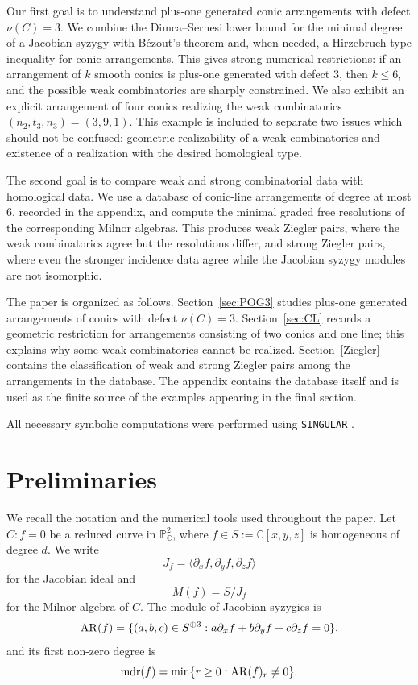 \documentclass[11pt]{article}
\theoremstyle{plain}
\theoremstyle{definition}
\begin{document}
Our first goal is to understand plus-one generated conic arrangements with defect $\nu(C)=3$. We combine the Dimca--Sernesi lower bound for the minimal degree of a Jacobian syzygy with B\'ezout's theorem and, when needed, a Hirzebruch-type inequality for conic arrangements. This gives strong numerical restrictions: if an arrangement of $k$ smooth conics is plus-one generated with defect $3$, then $k\leq 6$, and the possible weak combinatorics are sharply constrained. We also exhibit an explicit arrangement of four conics realizing the weak combinatorics $(n_2,t_3,n_3)=(3,9,1)$. This example is included to separate two issues which should not be confused: geometric realizability of a weak combinatorics and existence of a realization with the desired homological type.

The second goal is to compare weak and strong combinatorial data with homological data. We use a database of conic-line arrangements of degree at most $6$, recorded in the appendix, and compute the minimal graded free resolutions of the corresponding Milnor algebras. This produces weak Ziegler pairs, where the weak combinatorics agree but the resolutions differ, and strong Ziegler pairs, where even the stronger incidence data agree while the Jacobian syzygy modules are not isomorphic.

The paper is organized as follows. Section~\ref{sec:POG3} studies plus-one generated arrangements of conics with defect $\nu(C)=3$. Section~\ref{sec:CL} records a geometric restriction for arrangements consisting of two conics and one line; this explains why some weak combinatorics cannot be realized. Section~\ref{Ziegler} contains the classification of weak and strong Ziegler pairs among the arrangements in the database. The appendix contains the database itself and is used as the finite source of the examples appearing in the final section. 

All necessary symbolic computations were performed using \texttt{SINGULAR} \cite{Singular}.

\section{Preliminaries}
We recall the notation and the numerical tools used throughout the paper. Let $C:f=0$ be a reduced curve in $\mathbb{P}^{2}_{\mathbb{C}}$, where $f\in S:=\mathbb{C}[x,y,z]$ is homogeneous of degree $d$. We write
\[
J_f=\langle \partial_x f,\partial_y f,\partial_z f\rangle
\]
for the Jacobian ideal and
\[
M(f)=S/J_f
\]
for the Milnor algebra of $C$. The module of Jacobian syzygies is
\[
{\rm AR}(f)=\{(a,b,c)\in S^{\oplus 3}:a\partial_xf+b\partial_yf+c\partial_zf=0\},
\]
and its first non-zero degree is
\[
{\rm mdr}(f)=\min\{r\geq0:{\rm AR}(f)_r\neq0\}.
\]
\end{document}
